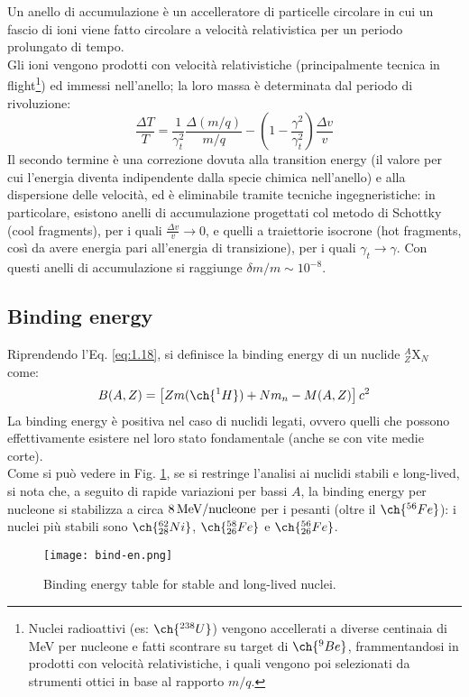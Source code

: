 Un anello di accumulazione è un accelleratore di particelle circolare in cui un fascio di ioni viene fatto circolare a velocità relativistica per un periodo prolungato di tempo.\\
Gli ioni vengono prodotti con velocità relativistiche (principalmente tecnica in flight\footnote{Nuclei radioattivi (es: $ \ch{^{238}U} $) vengono accellerati a diverse centinaia di MeV per nucleone e fatti scontrare su target di $ \ch{^{9}Be} $, frammentandosi in prodotti con velocità relativistiche, i quali vengono poi selezionati da strumenti ottici in base al rapporto $ m/q $.}) ed immessi nell'anello; la loro massa è determinata dal periodo di rivoluzione:
\begin{equation}
	\frac{\Delta T}{T} = \frac{1}{\gamma_t^2}\frac{\Delta (m/q)}{m/q} - \left( 1 - \frac{\gamma^2}{\gamma_t^2} \right) \frac{\Delta v}{v}
	\label{eq:1.24}
\end{equation}
Il secondo termine è una correzione dovuta alla transition energy (il valore per cui l'energia diventa indipendente dalla specie chimica nell'anello) e alla dispersione delle velocità, ed è eliminabile tramite tecniche ingegneristiche: in particolare, esistono anelli di accumulazione progettati col metodo di Schottky (cool fragments), per i quali $ \frac{\Delta v}{v} \rightarrow 0 $, e quelli a traiettorie isocrone (hot fragments, così da avere energia pari all'energia di transizione), per i quali $ \gamma_t \rightarrow \gamma $. Con questi anelli di accumulazione si raggiunge $ \delta m / m \sim 10^{-8} $.

\subsection{Binding energy}

Riprendendo l'Eq. \ref{eq:1.18}, si definisce la binding energy di un nuclide $ ^A_Z \text{X}_N $ come:
\begin{equation}
	B(A,Z) = \left[ Z m({\ch{^{1}H}}) + N m_n - M(A,Z) \right] c^2
	\label{eq:1.25}
\end{equation}
La binding energy è positiva nel caso di nuclidi legati, ovvero quelli che possono effettivamente esistere nel loro stato fondamentale (anche se con vite medie corte).\\
Come si può vedere in Fig. \ref{bind-en}, se si restringe l'analisi ai nuclidi stabili e long-lived, si nota che, a seguito di rapide variazioni per bassi $ A $, la binding energy per nucleone si stabilizza a circa $ 8\,\text{MeV}/\text{nucleone} $ per i pesanti (oltre il $ \ch{^{56}Fe} $): i nuclei più stabili sono $ \ch{^{62}_{28}Ni} $, $ \ch{^{58}_{26}Fe} $ e $ \ch{^{56}_{26}Fe} $.
\begin{figure}
	\centering
	\texttt{[image: bind-en.png]}
	\caption{Binding energy table for stable and long-lived nuclei.}
	\label{bind-en}
\end{figure}

